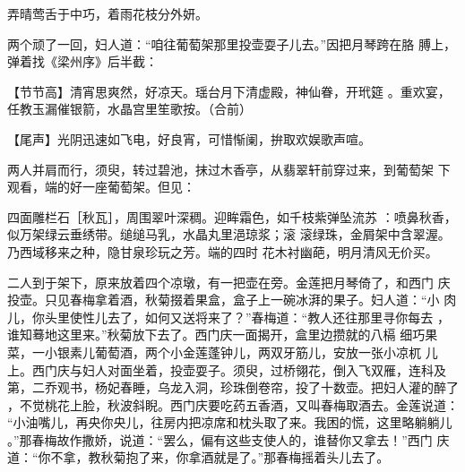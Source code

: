 弄晴莺舌于中巧，着雨花枝分外妍。

两个顽了一回，妇人道：“咱往葡萄架那里投壶耍子儿去。”因把月琴跨在胳
膊上，弹着找《梁州序》后半截：

【节节高】清宵思爽然，好凉天。瑶台月下清虚殿，神仙眷，开玳筵
。重欢宴，任教玉漏催银箭，水晶宫里笙歌按。（合前）

【尾声】光阴迅速如飞电，好良宵，可惜惭阑，拚取欢娱歌声喧。

两人并肩而行，须臾，转过碧池，抹过木香亭，从翡翠轩前穿过来，到葡萄架
下观看，端的好一座葡萄架。但见：

四面雕栏石［秋瓦］，周围翠叶深稠。迎眸霜色，如千枝紫弹坠流苏
：喷鼻秋香，似万架绿云垂绣带。缒缒马乳，水晶丸里浥琼浆；滚
滚绿珠，金屑架中含翠渥。乃西域移来之种，隐甘泉珍玩之芳。端的四时
花木衬幽葩，明月清风无价买。

二人到于架下，原来放着四个凉墩，有一把壶在旁。金莲把月琴倚了，和西门
庆投壶。只见春梅拿着酒，秋菊掇着果盒，盒子上一碗冰湃的果子。妇人道：“小
肉儿，你头里使性儿去了，如何又送将来了？”春梅道：“教人还往那里寻你每去
，谁知蓦地这里来。”秋菊放下去了。西门庆一面揭开，盒里边攒就的八槅
细巧果菜，一小银素儿葡萄酒，两个小金莲蓬钟儿，两双牙筋儿，安放一张小凉杌
儿上。西门庆与妇人对面坐着，投壶耍子。须臾，过桥翎花，倒入飞双雁，连科及
第，二乔观书，杨妃春睡，乌龙入洞，珍珠倒卷帘，投了十数壶。把妇人灌的醉了
，不觉桃花上脸，秋波斜睨。西门庆要吃药五香酒，又叫春梅取酒去。金莲说道：
“小油嘴儿，再央你央儿，往房内把凉席和枕头取了来。我困的慌，这里略躺躺儿
。”那春梅故作撒娇，说道：“罢么，偏有这些支使人的，谁替你又拿去！”西门
庆道：“你不拿，教秋菊抱了来，你拿酒就是了。”那春梅摇着头儿去了。

